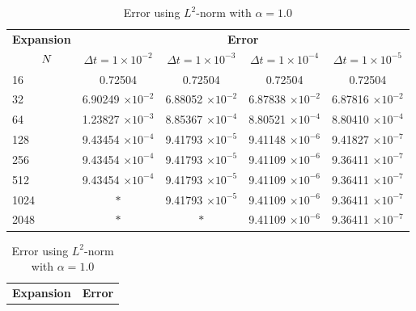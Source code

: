	\begin{table}[H]
		\begin{tabular}{lcccc}
			\toprule
			\multicolumn{1}{c}{\textbf{Expansion}} & \multicolumn{4}{c}{\textbf{Error}} \\
			$\hspace{9mm}N$ & $\Delta t=1\times 10^{-2}$ & $\Delta t=1\times 10^{-3}$ & $\Delta t=1\times 10^{-4}$ & $\Delta t=1\times 10^{-5}$ \\
			\midrule
			\hspace{7mm} 16 & 0.72504    & 0.72504    & 0.72504    & 0.72504    \\
			\midrule
			\hspace{7mm} 32 & 6.90249 $\times 10 ^{-2}$   & 6.88052 $\times 10 ^{-2}$   & 6.87838 $\times 10 ^{-2}$   & 6.87816 $\times 10 ^{-2}$   \\
			\midrule
			\hspace{7mm} 64 & 1.23827 $\times 10 ^{-3}$  & 8.85367 $\times 10 ^{-4}$ & 8.80521 $\times 10 ^{-4}$ & 8.80410 $\times 10 ^{-4}$  \\
			\midrule
			\hspace{7mm} 128 & 9.43454 $\times 10 ^{-4}$ & 9.41793 $\times 10 ^{-5}$ & 9.41148 $\times 10 ^{-6}$ & 9.41827 $\times 10 ^{-7}$  \\
			\midrule
			\hspace{7mm} 256 & 9.43454 $\times 10 ^{-4}$ & 9.41793 $\times 10 ^{-5}$ & 9.41109 $\times 10 ^{-6}$ & 9.36411 $\times 10 ^{-7}$ \\
			\midrule
			\hspace{7mm} 512 & 9.43454 $\times 10 ^{-4}$ & 9.41793 $\times 10 ^{-5}$ & 9.41109 $\times 10 ^{-6}$ & 9.36411 $\times 10 ^{-7}$ \\
			\midrule
			\hspace{7mm} 1024 & $\ast$ & 9.41793 $\times 10^{-5}$ & 9.41109 $\times 10^{-6}$ & 9.36411 $\times 10^{-7}$              \\
			\midrule
			\hspace{7mm} 2048 & $\ast$ & $\ast$ & 9.41109 $\times 10^{-6}$ & 9.36411 $\times 10^{-7}$   \\
			\bottomrule
		\end{tabular}
		\caption{Error using $L^2$-norm with $\alpha = 1.0$}
		\label{Galerkin_tabla_L2_alpha=1}
		\vspace{1cm}
		\begin{tabular}{lcccc}
			\toprule
			\multicolumn{1}{c}{\textbf{Expansion}} & \multicolumn{4}{c}{\textbf{Error}} \\

\end{tabular}
\end{table}
